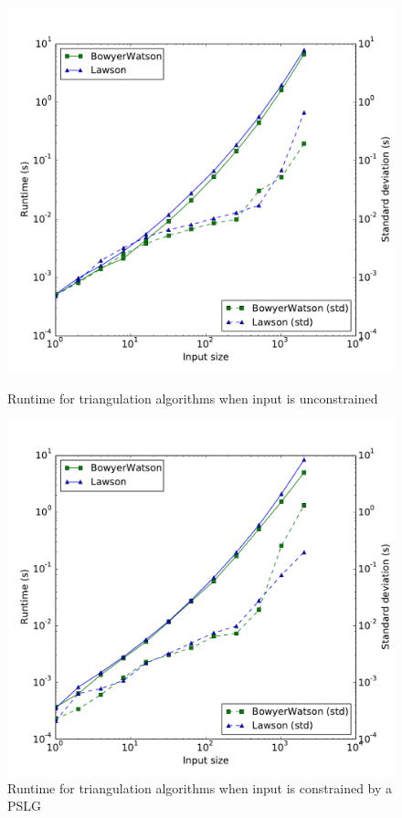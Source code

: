 \begin{figure}[t!]
    \centering
    \includegraphics[width=\columnwidth]{../images/runtime.pdf}
    \label{fig:triangulation-runtime}
    \caption{Runtime for triangulation algorithms when input is unconstrained}
\end{figure}

\begin{figure}[t!]
    \centering
    \includegraphics[width=\columnwidth]{../images/runtime_segments.pdf}
    \caption{Runtime for triangulation algorithms when input is constrained by a PSLG}
    \label{fig:triangulation-pslg-runtime}
\end{figure}

